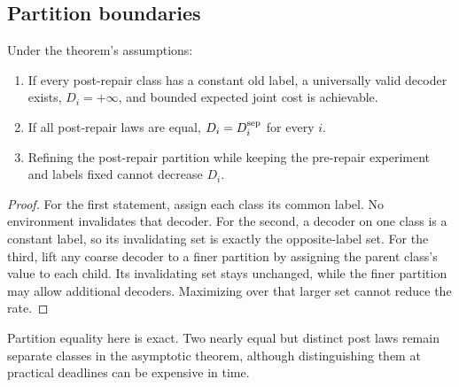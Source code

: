 \subsection{Partition boundaries}
\begin{corollary}\label{cor:partition}
Under the theorem's assumptions:
\begin{enumerate}
\item If every post-repair class has a constant old label, a universally valid
decoder exists, $D_i=+\infty$, and bounded expected joint cost is achievable.
\item If all post-repair laws are equal, $D_i=D_i^{\rm sep}$ for every $i$.
\item Refining the post-repair partition while keeping the pre-repair experiment
and labels fixed cannot decrease $D_i$.
\end{enumerate}
\end{corollary}
\begin{proof}
For the first statement, assign each class its common label. No environment
invalidates that decoder. For the second, a decoder on one class is a constant
label, so its invalidating set is exactly the opposite-label set.
For the third, lift any coarse decoder to a finer partition by assigning the
parent class's value to each child. Its invalidating set stays unchanged, while
the finer partition may allow additional decoders. Maximizing over that larger
set cannot reduce the rate.
\end{proof}
Partition equality here is exact. Two nearly equal but distinct post laws
remain separate classes in the asymptotic theorem, although distinguishing
them at practical deadlines can be expensive in time.
